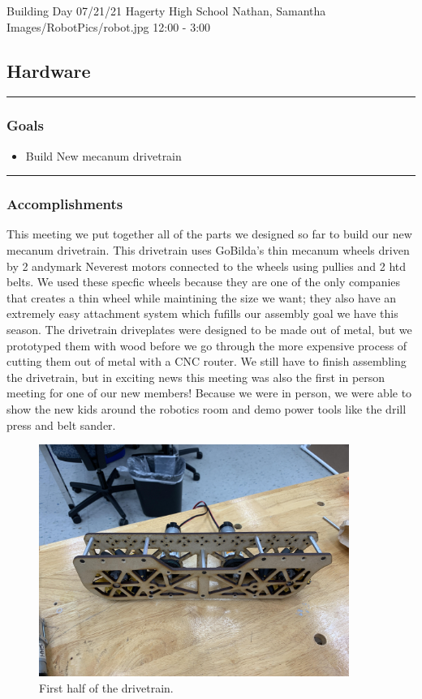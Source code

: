 \insertmeeting 
	{Building Day} 
	{07/21/21}
	{Hagerty High School}
	{Nathan, Samantha}
	{Images/RobotPics/robot.jpg}
	{12:00 - 3:00}
	
\subsection*{Hardware}
\noindent\hfil\rule{\textwidth}{.4pt}\hfil
\subsubsection*{Goals}
\begin{itemize}
    \item Build New mecanum drivetrain   

\end{itemize} 

\noindent\hfil\rule{\textwidth}{.4pt}\hfil

\subsubsection*{Accomplishments}
This meeting we put together all of the parts we designed so far to build our new mecanum drivetrain. This drivetrain uses GoBilda's thin mecanum wheels driven by 2 andymark Neverest motors connected to the wheels using pullies and 2 htd belts. We used these specfic wheels because they are one of the only companies that creates a thin wheel while maintining the size we want; they also have an extremely easy attachment system which fufills our assembly goal we have this season. The drivetrain driveplates were designed to be made out of metal, but we prototyped them with wood before we go through the more expensive process of cutting them out of metal with a CNC router. We still have to finish assembling the drivetrain, but in exciting news this meeting was also the first in person meeting for one of our new members! Because we were in person, we were able to show the new kids around the robotics room and demo power tools like the drill press and belt sander.

\begin{figure}[htp]
\centering
\includegraphics[width=0.9\textwidth, angle=0]{Meetings/July/07-21-21/drivetrain_7-20-21-NathanForrer.jpg}
\caption{First half of the drivetrain.}
\label{fig:pic1}
\end{figure}
